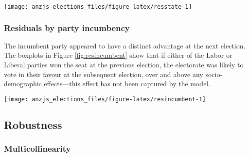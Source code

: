 \documentclass[
  times, doublespace]{anzsauth}
\let\origfigure\figure
\let\endorigfigure\endfigure
\renewenvironment{figure}[1][2] {
    \expandafter\origfigure\expandafter[htbp]
} {
    \endorigfigure
}
\begin{document}
\begin{figure}[h]

{\centering \texttt{[image: anzjs\_elections\_files/figure-latex/resstate-1]} 

}

\caption{Boxplot of residuals by state with jittered points. States ordered by median residual. A state-specific bias present only in the smaller states appeared to have not been captured by the model.}\label{fig:resstate}
\end{figure}

\hypertarget{residuals-by-party-incumbency}{%
\subsubsection*{Residuals by party incumbency}\label{residuals-by-party-incumbency}}

The incumbent party appeared to have a distinct advantage at the next election. The boxplots in Figure \ref{fig:resincumbent} show that if either of the Labor or Liberal parties won the seat at the previous election, the electorate was likely to vote in their favour at the subsequent election, over and above any socio-demographic effects---this effect has not been captured by the model.

\begin{figure}[h]

{\centering \texttt{[image: anzjs\_elections\_files/figure-latex/resincumbent-1]} 

}

\caption{Boxplot of residuals for incumbent and non-incumbent parties each year. An incumbent advantage was evident and had not been captured by the model.}\label{fig:resincumbent}
\end{figure}

\hypertarget{robustness}{%
\subsection{Robustness}\label{robustness}}

\hypertarget{multicollinearity}{%
\subsubsection*{Multicollinearity}\label{multicollinearity}}
\end{document}
